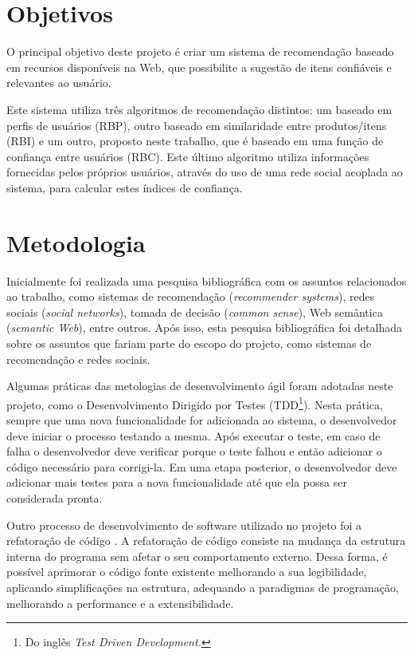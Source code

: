 

\section{Objetivos} %
\label{sec:objetivos}

 O principal objetivo deste projeto é criar um sistema de recomendação baseado em recursos disponíveis na Web, que possibilite a sugestão de itens confiáveis e relevantes ao usuário.

 Este sistema utiliza três algoritmos de recomendação distintos: um baseado em perfis de usuários (RBP), outro baseado em similaridade entre produtos/itens (RBI) e um outro, proposto neste trabalho, que é baseado em uma função de confiança entre usuários (RBC). Este último algoritmo utiliza informações fornecidas pelos próprios usuários, através do uso de uma rede social acoplada ao sistema, para calcular estes índices de confiança.


\section{Metodologia} %
\label{sec:metodologia}

 Inicialmente foi realizada uma pesquisa bibliográfica com os assuntos relacionados ao trabalho, como sistemas de recomendação (\textit{recommender systems}), redes sociais (\textit{social networks}), tomada de decisão (\textit{common sense}), Web semântica (\textit{semantic Web}), entre outros. Após isso, esta pesquisa bibliográfica foi detalhada sobre os assuntos que fariam parte do escopo do projeto, como sistemas de recomendação e redes sociais.

 Algumas práticas das metologias de desenvolvimento ágil foram adotadas neste projeto, como o Desenvolvimento Dirigido por Testes (TDD\footnote{Do inglês \textit{Test Driven Development.}}). Nesta prática, sempre que uma nova funcionalidade for adicionada ao sistema, o desenvolvedor deve iniciar o processo testando a mesma. Após executar o teste, em caso de falha o desenvolvedor deve verificar porque o teste falhou e então adicionar o código necessário para corrigi-la. Em uma etapa posterior, o desenvolvedor deve adicionar mais testes para a nova funcionalidade até que ela possa ser considerada pronta.
 
 Outro processo de desenvolvimento de software utilizado no projeto foi a refatoração de código \cite{fowler1999refactoring}. A refatoração de código consiste na mudança da estrutura interna do programa sem afetar o seu comportamento externo. Dessa forma, é possível aprimorar o código fonte existente melhorando a sua legibilidade, aplicando simplificações na estrutura, adequando a paradigmas de programação, melhorando a performance e a extensibilidade.
 
